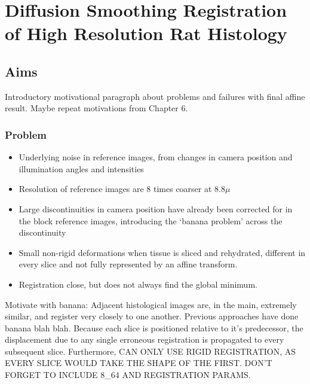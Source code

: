 \chapter{Diffusion Smoothing Registration of High Resolution Rat Histology} %
\label{cha:diffusion_smoothing_registration_of_high_resolution_rat_histology}

\dblspace

\section{Aims} %
\label{sec:aims}
  Introductory motivational paragraph about problems and failures with final affine result. Maybe repeat motivations from Chapter 6.
  
  \subsection{Problem}
    \begin{itemize}
      \item Underlying noise in reference images, from changes in camera position and illumination angles and intensities
      \item Resolution of reference images are 8 times coarser at 8.8$\mu$ 
      \item Large discontinuities in camera position have already been corrected for in the block reference images, introducing the `banana problem' across the discontinuity
      \item Small non-rigid deformations when tissue is sliced and rehydrated, different in every slice and not fully represented by an affine transform.
      \item Registration close, but does not always find the global minimum.
    \end{itemize}
    
    Motivate with banana: Adjacent histological images are, in the main, extremely similar, and register very closely to one another. Previous approaches have done banana blah blah. Because each slice is positioned relative to it's predecessor, the displacement due to any single erroneous registration is propagated to every subsequent slice. Furthermore, CAN ONLY USE RIGID REGISTRATION, AS EVERY SLICE WOULD TAKE THE SHAPE OF THE FIRST. DON'T FORGET TO INCLUDE 8\_64 AND REGISTRATION PARAMS.
    
